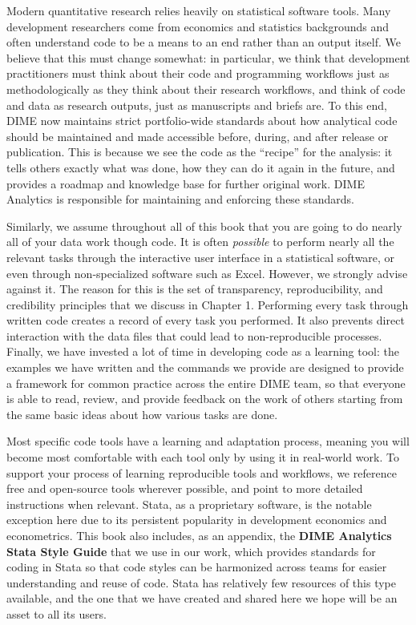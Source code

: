 Modern quantitative research relies heavily on statistical software tools.
Many development researchers come from economics and statistics backgrounds
and often understand code to be a means to an end rather than an output itself.
We believe that this must change somewhat:
in particular, we think that development practitioners
must think about their code and programming workflows
just as methodologically as they think about their research workflows,
and think of code and data as research outputs, just as manuscripts and briefs are.
To this end, DIME now maintains strict portfolio-wide standards
about how analytical code should be maintained and made accessible
before, during, and after release or publication.
This is because we see the code as the ``recipe'' for the analysis:
it tells others exactly what was done,
how they can do it again in the future,
and provides a roadmap and knowledge base for further original work.
DIME Analytics is responsible for maintaining and enforcing these standards.

Similarly, we assume throughout all of this book
that you are going to do nearly all of your data work though code.
It is often \textit{possible} to perform nearly all the relevant tasks
through the interactive user interface in a statistical software,
or even through non-specialized software such as Excel.
However, we strongly advise against it.
The reason for this is the set of
transparency, reproducibility, and credibility principles
that we discuss in Chapter 1.
Performing every task through written code
creates a record of every task you performed.
It also prevents direct interaction
with the data files that could lead to non-reproducible processes.
Finally, we have invested a lot of time in developing code as a learning tool:
the examples we have written and the commands we provide
are designed to provide a framework for common practice
across the entire DIME team, so that everyone is able to
read, review, and provide feedback on the work of others
starting from the same basic ideas about how various tasks are done.

Most specific code tools have a learning and adaptation process,
meaning you will become most comfortable with each tool
only by using it in real-world work.
To support your process of learning reproducible tools and workflows,
we reference free and open-source tools wherever possible,
and point to more detailed instructions when relevant.
Stata, as a proprietary software, is the notable exception here
due to its persistent popularity in development economics and econometrics.
This book also includes, as an appendix,
the \textbf{DIME Analytics Stata Style Guide}
that we use in our work, which provides
standards for coding in Stata so that code styles
can be harmonized across teams for easier understanding and reuse of code.
Stata has relatively few resources of this type available,
and the one that we have created and shared here
we hope will be an asset to all its users.


